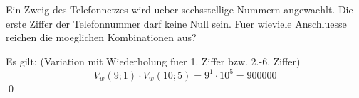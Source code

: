 \documentclass{abgabe}
\begin{document}
\begin{questions}
    \question
    Ein Zweig des Telefonnetzes wird ueber sechsstellige Nummern angewaehlt. 
    Die erste Ziffer der Telefonnummer darf keine Null sein. 
    Fuer wieviele Anschluesse reichen die moeglichen Kombinationen aus?
    \begin{solution}
        Es gilt: (Variation mit Wiederholung fuer 1. Ziffer bzw. 2.-6. Ziffer)
        \[ 
            V_w(9;1) \cdot V_w(10;5) = 9^1 \cdot 10^5 = \num{900000}
        \] 
        \qed
    \end{solution}
\end{questions}
\end{document}
